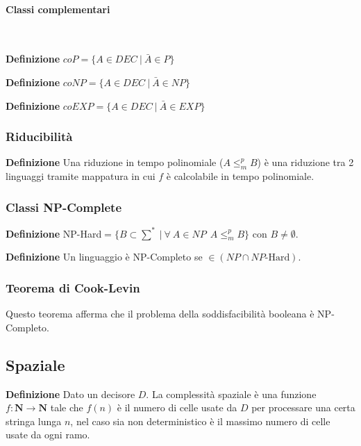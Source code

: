 \documentclass{article}
\begin{document}
\paragraph{Classi complementari} $\ $\newline

\noindent\textbf{Definizione} $coP=\{A\in DEC\ |\ \bar{A}\in P\}$\newline

\noindent\textbf{Definizione} $coNP=\{A\in DEC\ |\ \bar{A}\in NP\}$\newline

\noindent\textbf{Definizione} $coEXP=\{A\in DEC\ |\ \bar{A}\in EXP\}$

\subsubsection{Riducibilità}

\textbf{Definizione} Una riduzione in tempo polinomiale ($A\leq_m^p B$) è una riduzione tra 2 linguaggi tramite mappatura in cui $f$ è calcolabile in tempo polinomiale.

\subsubsection{Classi NP-Complete}

\textbf{Definizione} NP-Hard$=\{B\subset\sum^*\ |\ \forall\ A\in NP\ \ A\leq_m^p B\}$ con $B\neq\emptyset$.\newline

\noindent\textbf{Definizione} Un linguaggio è NP-Completo se $\in(NP\cap NP\text{-Hard})$.\newline

\subsubsection{Teorema di Cook-Levin}

Questo teorema afferma che il problema della soddisfacibilità booleana è NP-Completo.

\subsection{Spaziale}

\textbf{Definizione} Dato un decisore $D$. La complessità spaziale è una funzione $f:\mathbf{N}\rightarrow\mathbf{N}$ tale che $f(n)$ è il numero di celle usate da $D$ per processare una certa stringa lunga $n$, nel caso sia non deterministico è il massimo numero di celle usate da ogni ramo.\newline
\end{document}
